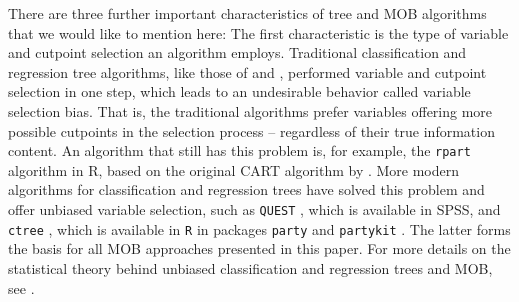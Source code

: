 \documentclass[doc,floatsintext,natbib]{apa7}
\begin{document}


There are three further important characteristics of tree and MOB algorithms that we would like to mention here: The first characteristic is the type of variable and cutpoint selection an algorithm employs. Traditional classification and regression tree algorithms, like those of \citet{Breetal:1984} and \citet{Qui:1993}, performed variable and cutpoint selection in one step, which leads to an undesirable behavior called variable selection bias. That is, the traditional algorithms prefer variables offering more possible cutpoints in the selection process -- regardless of their true information content. An algorithm that still has this problem is, for example, the \texttt{rpart} algorithm in R, based on the original CART algorithm by \citet{Breetal:1984}. More modern algorithms for classification and regression trees have solved this problem and offer unbiased variable selection, such as \texttt{QUEST} \citep{LohShi:1997}, which is available in SPSS, and \texttt{ctree} \citep{Hotetal:2006}, which is available in \texttt{R} in packages \texttt{party} and \texttt{partykit} \citep{partykit:pkg}. The latter forms the basis for all MOB approaches presented in this paper. For more details on the statistical theory behind unbiased classification and regression trees and MOB, see \citet{Hotetal:2006,StrMalTut:2009:PM,StroyKopf15}.  
\end{document}
